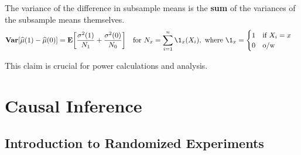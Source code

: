\begin{clm}
	The variance of the difference in subsample means is the \textbf{sum} of the variances of the subsample means themselves. \[\V\qty[\hat\mu(1)-\hat\mu(0)]=\E\qty[\dfrac{\sigma^2(1)}{N_1}+\dfrac{\sigma^2(0)}{N_0}]\quad\text{for } N_x=\sum_{i=1}^n\1_x(X_i),\text{ where }\1_x=\begin{cases}1\quad\text{if } X_i=x\\0\quad\text{o/w}\end{cases}\]	
\end{clm}
\begin{rmk}
	This claim is crucial for power calculations and analysis.
\end{rmk}


\newpage
\section{Causal Inference}
\subsection{Introduction to Randomized Experiments}


